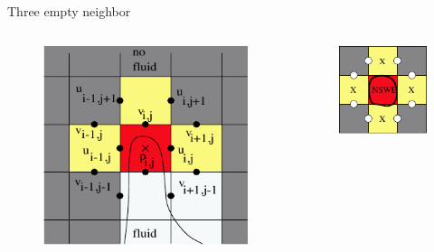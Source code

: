 \documentclass{beamer}
\begin{document}
	\begin{frame}{Three empty neighbor}
	  \begin{columns}
	 	\begin{column}[c]{0.4\textwidth}
	 	   \begin{figure}
			\includegraphics[width=1\textwidth]{pic/three.pdf}
			\end{figure}
		\end{column}
		\begin{column}[c]{0.4\textwidth}
	 	   \begin{figure}
	 	   			\includegraphics[width=1\textwidth]{pic/four.pdf}
			\end{figure}
		\end{column}
	\end{columns}
   \end{frame}	
		
\end{document}
